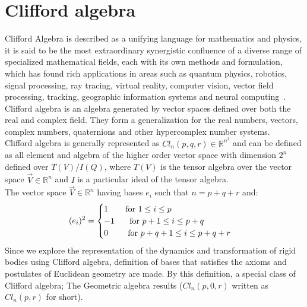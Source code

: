 \documentclass[12pt,onecolumn,letterpaper]{article} %
\begin{document}
\section{Clifford algebra}\label{Cliffordd}
 Clifford Algebra is described as a unifying language for mathematics and physics, it is said to be the most extraordinary synergistic confluence of a diverse range of specialized mathematical fields, each with its own methods and formulation, which has found rich applications in areas such as quantum physics, robotics, signal processing, ray tracing, virtual reality, computer vision, vector field processing, tracking, geographic information systems and neural computing~\cite{lundholm2009clifford,lehar2014visual,baker2012matrix}.\\
\indent Clifford algebra is an algebra generated by vector spaces defined over both the real and complex field. They form a generalization for the real numbers, vectors, complex numbers, quaternions and other hypercomplex number systems.\\
\indent Clifford algebra is generally represented as $Cl_n(p,q,r)\in\mathbb{R}^{n^2}$ and can be defined as all element and algebra of the higher order vector space with dimension $2^n$ defined over $T(V)/I(Q)$, where $T(V)$ is the tensor algebra over the vector space $\vec{V}\in\mathbb{R}^{n}$ and $I$ is a particular ideal of the tensor algebra.\\
The vector space $\vec{V}\in\mathbb{R}^{n}$ having bases $e_i$ such that $n=p+q+r$ and:  %
 \begin{equation}
  (e_i)^2= \begin{cases} 
      1\ \hspace{0.5cm}{\mbox{ for }} 1\le i \le p \\
      -1\ \hspace{0.4cm}{\mbox{ for }} p+1\le i \le p+q \\
      0\ \hspace{0.6cm}{\mbox{ for }} p+q+1\le i \le p+q+r
   \end{cases}\label{velocitydependence} 
\end{equation}
Since we explore the representation of the dynamics and transformation of rigid bodies using Clifford algebra, definition of bases that satisfies the axioms and postulates of Euclidean geometry are made. By this definition, a special class of Clifford algebra; The Geometric algebra results ($Cl_n(p,0,r)$ written as $Cl_n(p,r)$ for short).
\end{document}
